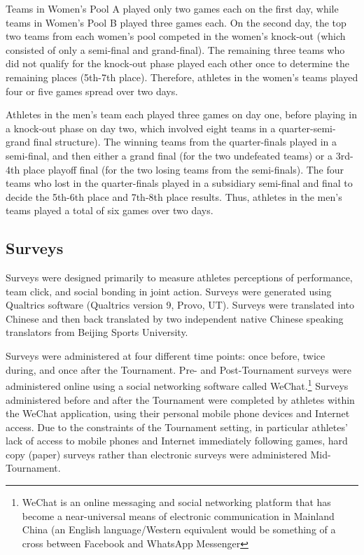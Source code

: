 \begin{CJK}{UTF8}{gbsn}
Teams in Women's Pool A played only two games each on the first day, while teams in Women's Pool B played three games each. On the second day, the top two teams from each women's pool competed in the women's knock-out (which consisted of only a semi-final and grand-final).  The remaining three teams who did not qualify for the knock-out phase played each other once to determine the remaining places (5th-7th place).  Therefore, athletes in the women's teams played four or five games spread over two days.

Athletes in the men's team each played three games on day one, before playing in a knock-out phase on day two, which involved eight teams in a quarter-semi-grand final structure). The winning teams from the quarter-finals played in a semi-final, and then either a grand final (for the two undefeated teams) or a 3rd-4th place playoff final (for the two losing teams from the semi-finals). The four teams who lost in the quarter-finals played in a subsidiary semi-final and final to decide the 5th-6th place and 7th-8th place results. Thus, athletes in the men's teams played a total of six games over two days.




\subsection{Surveys}
Surveys were designed primarily to measure athletes perceptions of performance, team click, and social bonding in joint action.  Surveys were generated using Qualtrics software (Qualtrics version 9, Provo, UT). Surveys were translated into Chinese and then back translated by two independent native Chinese speaking translators from Beijing Sports University.

Surveys were administered at four different time points: once before, twice during, and once after the Tournament.  Pre- and Post-Tournament surveys were administered online using a social networking software called WeChat.\footnote{WeChat is an online messaging and social networking platform that has become a near-universal means of electronic communication in Mainland China (an English language/Western equivalent would be something of a cross between Facebook and WhatsApp Messenger} Surveys administered before and after the Tournament were completed by athletes within the WeChat application, using their personal mobile phone devices and Internet access.  Due to the constraints of the Tournament setting, in particular athletes’ lack of access to mobile phones and Internet immediately following games, hard copy (paper) surveys rather than electronic surveys were administered Mid-Tournament.



\end{CJK}
